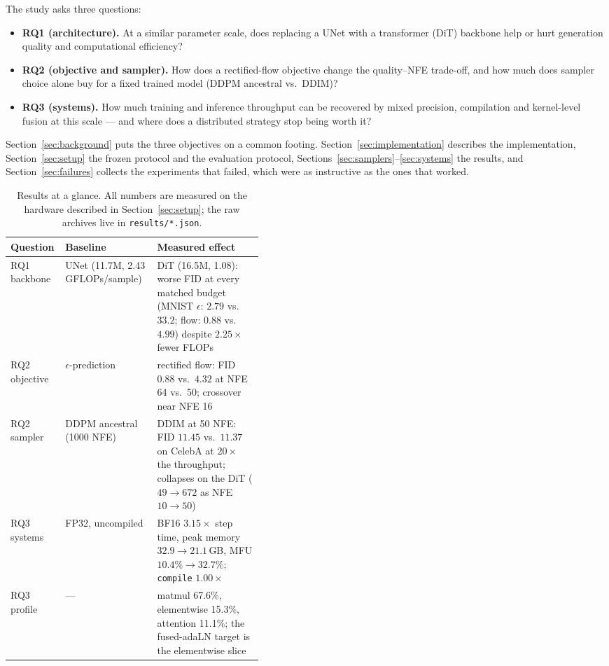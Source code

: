 \documentclass{article}
\begin{document}
The study asks three questions:

\begin{itemize}
  \item \textbf{RQ1 (architecture).} At a similar parameter scale, does replacing a UNet
        with a transformer (DiT) backbone help or hurt generation quality and computational
        efficiency?
  \item \textbf{RQ2 (objective and sampler).} How does a rectified-flow objective change the
        quality--NFE trade-off, and how much does sampler choice alone buy for a fixed
        trained model (DDPM ancestral vs.\ DDIM)?
  \item \textbf{RQ3 (systems).} How much training and inference throughput can be recovered
        by mixed precision, compilation and kernel-level fusion at this scale --- and where
        does a distributed strategy stop being worth it?
\end{itemize}

Section~\ref{sec:background} puts the three objectives on a common footing.
Section~\ref{sec:implementation} describes the implementation,
Section~\ref{sec:setup} the frozen protocol and the evaluation protocol,
Sections~\ref{sec:samplers}--\ref{sec:systems} the results, and
Section~\ref{sec:failures} collects the experiments that failed, which were as instructive
as the ones that worked.

\begin{table}[t]
  \caption{Results at a glance. All numbers are measured on the hardware described in
  Section~\ref{sec:setup}; the raw archives live in \texttt{results/*.json}.}
  \label{tab:glance}
  \centering
  \small
  \begin{tabular}{@{}llp{0.42\linewidth}@{}}
    \toprule
    Question & Baseline & Measured effect \\
    \midrule
    RQ1 backbone & UNet (11.7M, 2.43 GFLOPs/sample) &
      DiT (16.5M, 1.08): worse FID at every matched budget
      (MNIST $\epsilon$: $2.79$ vs.\ $33.2$; flow: $0.88$ vs.\ $4.99$) despite $2.25\times$
      fewer FLOPs \\
    RQ2 objective & $\epsilon$-prediction &
      rectified flow: FID $0.88$ vs.\ $4.32$ at NFE 64 vs.\ 50; crossover near NFE 16 \\
    RQ2 sampler & DDPM ancestral (1000 NFE) &
      DDIM at 50 NFE: FID $11.45$ vs.\ $11.37$ on CelebA at $20\times$ the throughput;
      collapses on the DiT ($49\!\rightarrow\!672$ as NFE $10\!\rightarrow\!50$) \\
    RQ3 systems & FP32, uncompiled &
      BF16 $3.15\times$ step time, peak memory $32.9\!\rightarrow\!21.1$\,GB, MFU
      $10.4\%\!\rightarrow\!32.7\%$; \texttt{compile} $1.00\times$ \\
    RQ3 profile & --- &
      matmul 67.6\%, elementwise 15.3\%, attention 11.1\%; the fused-adaLN target is the
      elementwise slice \\
    \bottomrule
  \end{tabular}
\end{table}
\end{document}

